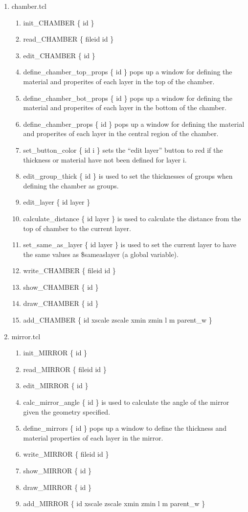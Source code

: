 \documentclass[12pt]{book}
\begin{document}
\begin{enumerate}
\item chamber.tcl
\begin{enumerate}
\item {\sf init\_CHAMBER \{ id \}}
\item {\sf read\_CHAMBER \{ fileid id \}}
\item {\sf edit\_CHAMBER \{ id \}}
\item {\sf define\_chamber\_top\_props \{ id \}} pops up a window for
defining the material and properites of each layer in the top of the chamber.
\item {\sf define\_chamber\_bot\_props \{ id \}} pops up a window for
defining the material and properites of each layer in the bottom of the
chamber.
\item {\sf define\_chamber\_props \{ id \}} pops up a window for
defining the material and properites of each layer in the central region
of the chamber.
\item {\sf set\_button\_color \{ id i \}} sets the ``edit layer'' button to
red if the thickness or material have not been defined for layer i.
\item {\sf edit\_group\_thick \{ id \}} is used to set the thicknesses of
groups when defining the chamber as groups.
\item {\sf edit\_layer \{ id layer \}}
\item {\sf calculate\_distance \{ id layer \}} is used to calculate the distance
from the top of chamber to the current layer.
\item {\sf set\_same\_as\_layer \{ id layer \}} is used to set the current layer
to have the same values as \$sameaslayer (a global variable).
\item {\sf write\_CHAMBER \{ fileid id \}}
\item {\sf show\_CHAMBER \{ id \}}
\item {\sf draw\_CHAMBER \{ id \}}
\item {\sf add\_CHAMBER \{ id xscale zscale xmin zmin l m parent\_w \}}
\end{enumerate}

\item mirror.tcl
\begin{enumerate}
\item {\sf init\_MIRROR \{ id \}}
\item {\sf read\_MIRROR \{ fileid id \}}
\item {\sf edit\_MIRROR \{ id \}}
\item {\sf calc\_mirror\_angle \{ id \}} is used to calculate the angle of the
mirror given the geometry specified.
\item {\sf define\_mirrors \{ id \}} pops up a window to define the
thickness and material properties of each layer in the mirror.
\item {\sf write\_MIRROR \{ fileid id \}}
\item {\sf show\_MIRROR \{ id \}}
\item {\sf draw\_MIRROR \{ id \}}
\item {\sf add\_MIRROR \{ id xscale zscale xmin zmin l m parent\_w \}}
\end{enumerate}


\end{enumerate}
\end{document}
